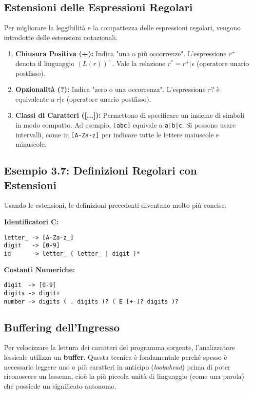 \documentclass[a4paper, 11pt]{article}
\begin{document}
\subsection{Estensioni delle Espressioni Regolari }
Per migliorare la leggibilità e la compattezza delle espressioni regolari, vengono introdotte delle estensioni notazionali.
\begin{enumerate}
    \item \textbf{Chiusura Positiva (+):} Indica "una o più occorrenze". L'espressione $r^+$ denota il linguaggio $(L(r))^+$. Vale la relazione $r^* = r^+ | \epsilon$ (operatore unario postfisso).

    \item \textbf{Opzionalità (?):} Indica "zero o una occorrenza". L'espressione $r?$ è equivalente a $r|\epsilon$ (operatore unario postfisso).

    \item \textbf{Classi di Caratteri ([...]):} Permettono di specificare un insieme di simboli in modo compatto. Ad esempio, \texttt{[abc]} equivale a \texttt{a|b|c}. Si possono usare intervalli, come in \texttt{[A-Za-z]} per indicare tutte le lettere maiuscole e minuscole.
\end{enumerate}

\subsection{Esempio 3.7: Definizioni Regolari con Estensioni}
Usando le estensioni, le definizioni precedenti diventano molto più concise.

\textbf{Identificatori C:}
\begin{Verbatim}[frame=single]
letter_ -> [A-Za-z_]
digit   -> [0-9]
id      -> letter_ ( letter_ | digit )*
\end{Verbatim}

\textbf{Costanti Numeriche:}
\begin{Verbatim}[frame=single]
digit  -> [0-9]
digits -> digit+
number -> digits ( . digits )? ( E [+-]? digits )?
\end{Verbatim}

\subsection{Buffering dell'Ingresso }

Per velocizzare la lettura dei caratteri del programma sorgente, l'analizzatore lessicale utilizza un \textbf{buffer}. Questa tecnica è fondamentale perché spesso è necessario leggere uno o più caratteri in anticipo (\textit{lookahead}) prima di poter riconoscere un lessema, cioè la più piccola unità di linguaggio (come una parola) che possiede un significato autonomo.
\end{document}
